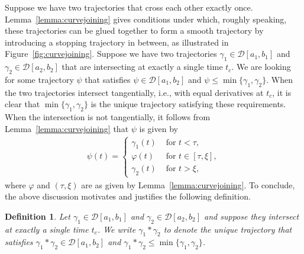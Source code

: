 \documentclass[a4paper]{article}
\theoremstyle{definition}
\theoremstyle{plain}
\newtheorem{define}{Definition\hspace{0.25em}\ignorespaces}
\begin{document}
Suppose we have two trajectories that cross each other exactly once.
Lemma~\ref{lemma:curvejoining} gives conditions under which, roughly speaking,
these trajectories can be glued together to form a smooth trajectory by
introducing a stopping trajectory in between, as illustrated in Figure~\ref{fig:curvejoining}.
%
Suppose we have two trajectories $\gamma_{1} \in \mathcal{D}[a_{1}, b_{1}]$ and
$\gamma_{2} \in \mathcal{D}[a_{2}, b_{2}]$ that are intersecting at exactly a
single time $t_{c}$. We are looking for some trajectory $\psi$ that satisfies
$\psi \in \mathcal{D}[a_{1}, b_{2}]$ and
$\psi \leq \min\{\gamma_{1}, \gamma_{2}\}$.
%
When the two trajectories intersect tangentially, i.e., with equal derivatives
at $t_{c}$, it is clear that $\min\{\gamma_{1}, \gamma_{2}\}$ is the unique
trajectory satisfying these requirements. When the intersection is not
tangentially, it follows from Lemma~\ref{lemma:curvejoining} that $\psi$ is
given by
\begin{align}
  \psi(t) =
  \begin{cases}
    \gamma_{1}(t) & \text{ for } t < \tau , \\
    \varphi(t) & \text{ for } t \in [\tau, \xi] , \\
    \gamma_{2}(t) & \text{ for } t > \xi ,
  \end{cases}
\end{align}
where $\varphi$ and $(\tau,\xi)$ are as given by
Lemma~\ref{lemma:curvejoining}.
%
To conclude, the above discussion motivates and justifies the following
definition.

\begin{define}
  Let $\gamma_{1} \in \mathcal{D}[a_{1}, b_{1}]$ and
  $\gamma_{2} \in \mathcal{D}[a_{2}, b_{2}]$ and suppose they intersect at
  exactly a single time $t_{c}$. We write $\gamma_{1} * \gamma_{2}$ to denote
  the unique trajectory that satisfies
  $\gamma_{1} * \gamma_{2} \in \mathcal{D}[a_{1}, b_{2}]$ and
  $\gamma_{1} * \gamma_{2} \leq \min\{\gamma_{1}, \gamma_{2}\}$.
\end{define}
\end{document}
